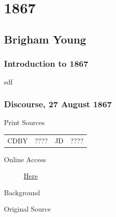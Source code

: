 \section{1867}

	\subsection{Brigham Young}
		\label{EMS-1867-BY}

		\subsubsection{Introduction to 1867}
		
			sdf
			
		\subsubsection{Discourse, 27 August 1867}
			\label{EMS-1867-BY-27-AUG-1867}
			
			\begin{description}
					\item[Print Sources]
				\end{description}

					\begin{tabular}{p{0.5in}p{1in}p{0.5in}p{1in}}
					CDBY	& ????		& JD 		& ???? \\
					\end{tabular}
				
				\begin{description}
					\item[Online Access] \href{https://drive.google.com/file/d/1P2vZxfshlAHLvrKvHNJreWkmvrL2QqJz/view?usp=sharing}{Here}
				\end{description}
				
				\begin{description}
					\item[Background]
				\end{description}
				
					\phantom{.}
				
				\begin{description}
					\item[Original Source]
				\end{description}
				
